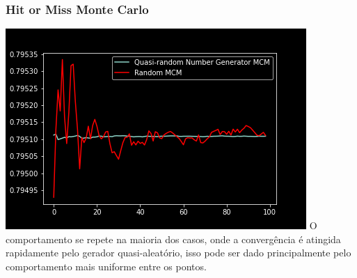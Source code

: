 \documentclass[twocolumn,amsmath,amssymb,floatfix]{revtex4}
\begin{document}
\subsubsection{Hit or Miss Monte Carlo}
\includegraphics[scale=0.55]{HitOrMissComparison.png}
\indent O comportamento se repete na maioria dos casos, onde a convergência é atingida rapidamente pelo gerador quasi-aleatório, isso pode ser dado principalmente pelo comportamento mais uniforme entre os pontos.
\vfill\null
\columnbreak
\end{document}
